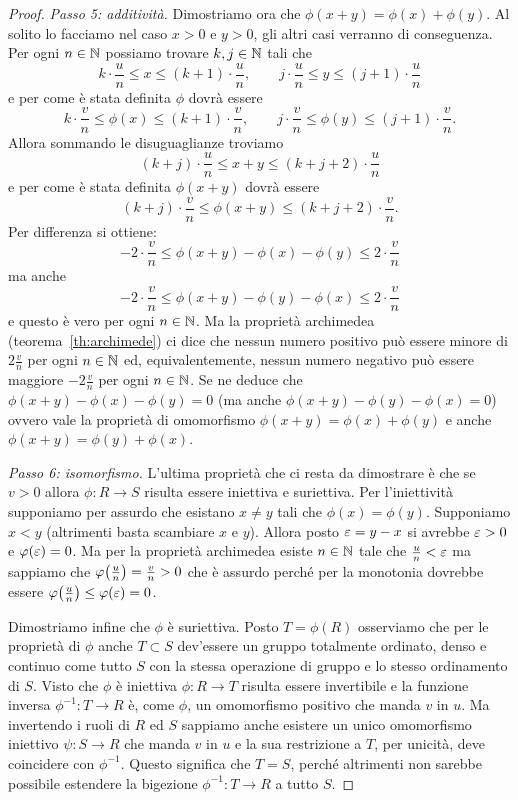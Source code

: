 \begin{proof}
\emph{Passo 5: additività.}
Dimostriamo ora che $\phi(x+y)=\phi(x)+\phi(y)$.
Al solito lo facciamo nel caso $x>0$ e $y>0$, 
gli altri casi verranno di conseguenza.
Per ogni $n\in {\mathbb N}$ possiamo trovare $k,j\in {\mathbb N}$ tali che 
\[
  k\cdot \frac u n \le x \le (k+1)\cdot \frac u n, \qquad 
  j\cdot \frac u n \le y \le (j+1)\cdot \frac u n
\]
e per come è stata definita $\phi$ dovrà essere 
\[
  k\cdot \frac v n \le \phi(x) \le (k+1)\cdot\frac v n, \qquad  
  j\cdot \frac v n \le \phi(y) \le (j+1)\cdot\frac v n.
\]
Allora sommando le disuguaglianze troviamo 
\[
  (k+j) \cdot \frac u n \le x + y \le (k+j+2) \cdot \frac u n  
\]
e per come è stata definita $\phi(x+y)$ dovrà essere 
\[
  (k+j)\cdot \frac v n \le \phi(x+y) \le (k+j+2)\cdot \frac v n.
\]
Per differenza si ottiene:
\[
 -2\cdot \frac v n \le \phi(x+y) - \phi(x) - \phi(y) \le 2\cdot \frac v n
\]
ma anche 
\[
 -2\cdot \frac v n \le \phi(x+y) - \phi(y) - \phi(x) \le 2\cdot \frac v n
\]
e questo è vero per ogni $n\in {\mathbb N}$.
Ma la proprietà archimedea (teorema~\ref{th:archimede}) 
ci dice che nessun numero positivo 
può essere minore di $2\frac v n$ per ogni $n\in {\mathbb N}$ ed, equivalentemente,
nessun numero negativo può essere maggiore $-2\frac v n$ per ogni $n\in {\mathbb N}$.
Se ne deduce che $\phi(x+y)-\phi(x)-\phi(y)=0$ 
(ma anche $\phi(x+y) - \phi(y)-\phi(x)=0$)
ovvero vale la proprietà di omomorfismo $\phi(x+y)=\phi(x) + \phi(y)$
e anche $\phi(x+y) = \phi(y) + \phi(x)$.

\emph{Passo 6: isomorfismo.}
L'ultima proprietà che ci resta da dimostrare è che 
se $v > 0$ allora $\phi\colon R\to S$ 
risulta essere iniettiva e suriettiva. 
Per l'iniettività supponiamo per assurdo che esistano 
$x \neq y$ tali che $\phi(x) = \phi(y)$.
Supponiamo $x<y$ (altrimenti basta scambiare $x$ e $y$).
Allora posto $\varepsilon = y - x$ si avrebbe $\varepsilon>0$ e $\varphi(\varepsilon)=0$.
Ma per la proprietà archimedea esiste $n\in {\mathbb N}$ tale che 
$\frac u n < \varepsilon$ ma sappiamo che $\varphi{\left( \frac u n \right)} = \frac v n >0$
che è assurdo perché per la monotonia dovrebbe essere 
$\varphi{\left( \frac u n \right)} \le \varphi(\varepsilon) = 0$.

Dimostriamo infine che $\phi$ è suriettiva. 
Posto $T=\phi(R)$ osserviamo che per le proprietà di $\phi$ 
anche $T\subset S$ dev'essere 
un gruppo totalmente ordinato, denso e continuo come tutto $S$
con la stessa operazione di gruppo e lo stesso ordinamento di $S$.
Visto che $\phi$ è iniettiva $\phi\colon R\to T$ 
risulta essere invertibile
e la funzione inversa $\phi^{-1}\colon T\to R$ è, come $\phi$, 
un omomorfismo positivo che manda $v$ in $u$.
Ma invertendo i ruoli di $R$ ed $S$ sappiamo anche esistere un 
unico omomorfismo iniettivo $\psi\colon S\to R$ 
che manda $v$ in $u$ e la sua 
restrizione a $T$, per unicità, deve coincidere con $\phi^{-1}$.
Questo significa che $T=S$, perché altrimenti non sarebbe possibile 
estendere la bigezione $\phi^{-1}\colon T \to R$ a tutto $S$.


\end{proof}
